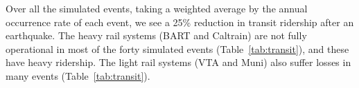 Over all the simulated events, taking a weighted average by the annual occurrence rate of each event, we see a 25\% reduction in transit ridership after an earthquake. The heavy rail systems (BART and Caltrain) are not fully operational in most of the forty simulated events (Table~\ref{tab:transit}), and these have heavy ridership. The light rail systems (VTA and Muni) also suffer losses in many events (Table~\ref{tab:transit}). %
